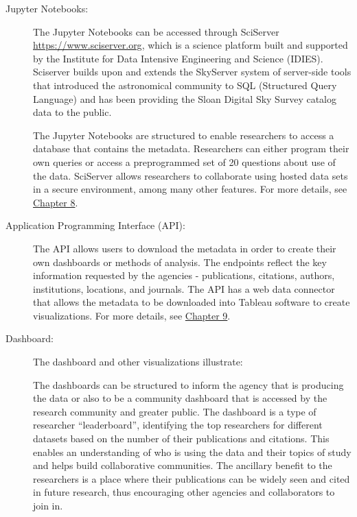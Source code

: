 \documentclass[titlepage, 11pt]{article}
\begin{document}
{\begin{description}
\item [Jupyter Notebooks:] The Jupyter Notebooks can be accessed through SciServer \url{https://www.sciserver.org}, which is a science platform built and supported by the Institute for Data Intensive Engineering and Science (IDIES).  Sciserver builds upon and extends the SkyServer system of server-side tools that introduced the astronomical community to SQL (Structured Query Language) and has been providing the Sloan Digital Sky Survey catalog data to the public. 

The Jupyter Notebooks are structured to enable researchers to access a database that contains the metadata. Researchers can either program their own queries or access a preprogrammed set of 20 questions about use of the data. SciServer allows researchers to collaborate using hosted data sets in a secure environment, among many other features. For more details, see \hyperref[sec:Chapter8]{Chapter 8}.

\item [Application Programming Interface (API):] The API allows users to download the metadata in order to create their own dashboards or methods of analysis. The endpoints reflect the key information requested by the agencies - publications, citations, authors, institutions, locations, and journals.  The API has a web data connector that allows the metadata to be downloaded into Tableau software to create visualizations. For more details, see \hyperref[sec:Chapter9]{Chapter 9}.

\item [Dashboard:] The dashboard and other visualizations illustrate: The dashboards can be structured to inform the agency that is producing the data or also to be a community dashboard that is accessed by the research community and greater public. The dashboard is a type of researcher “leaderboard”, identifying the top researchers for different datasets based on the number of their publications and citations. This enables an understanding of who is using the data and their topics of study and helps build collaborative communities. The ancillary benefit to the researchers is a place where their publications can be widely seen and cited in future research, thus encouraging other agencies and collaborators to join in.
\end{description}

}
\end{document}
